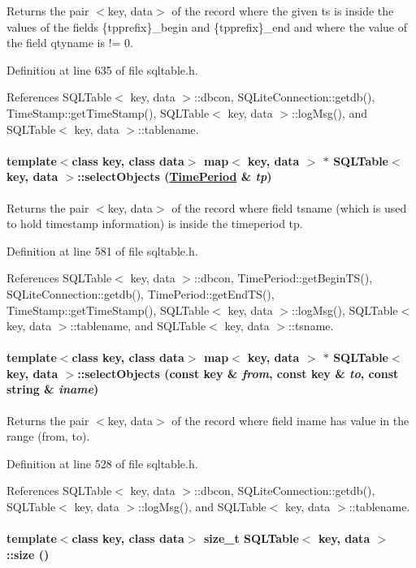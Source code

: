 Returns the pair $<$key, data$>$ of the record where the given ts is inside the values of the fields \{tpprefix\}\_\-begin and \{tpprefix\}\_\-end and where the value of the field qtyname is != 0. 

Definition at line 635 of file sqltable.h.

References SQLTable$<$ key, data $>$::dbcon, SQLite\-Connection::getdb(), Time\-Stamp::get\-Time\-Stamp(), SQLTable$<$ key, data $>$::log\-Msg(), and SQLTable$<$ key, data $>$::tablename.\hypertarget{classSQLTable_SQLTablea10}{
\paragraph[selectObjects]{\setlength{\rightskip}{0pt plus 5cm}template$<$class key, class data$>$ map$<$ key, data $>$ $\ast$ SQLTable$<$ key, data $>$::select\-Objects (\hyperlink{classTimePeriod}{Time\-Period} \& {\em tp})}\hfill}
\label{classSQLTable_SQLTablea10}


Returns the pair $<$key, data$>$ of the record where field tsname (which is used to hold timestamp information) is inside the timeperiod tp. 

Definition at line 581 of file sqltable.h.

References SQLTable$<$ key, data $>$::dbcon, Time\-Period::get\-Begin\-TS(), SQLite\-Connection::getdb(), Time\-Period::get\-End\-TS(), Time\-Stamp::get\-Time\-Stamp(), SQLTable$<$ key, data $>$::log\-Msg(), SQLTable$<$ key, data $>$::tablename, and SQLTable$<$ key, data $>$::tsname.\hypertarget{classSQLTable_SQLTablea9}{
\paragraph[selectObjects]{\setlength{\rightskip}{0pt plus 5cm}template$<$class key, class data$>$ map$<$ key, data $>$ $\ast$ SQLTable$<$ key, data $>$::select\-Objects (const key \& {\em from}, const key \& {\em to}, const string \& {\em iname})}\hfill}
\label{classSQLTable_SQLTablea9}


Returns the pair $<$key, data$>$ of the record where field iname has value in the range (from, to). 

Definition at line 528 of file sqltable.h.

References SQLTable$<$ key, data $>$::dbcon, SQLite\-Connection::getdb(), SQLTable$<$ key, data $>$::log\-Msg(), and SQLTable$<$ key, data $>$::tablename.\hypertarget{classSQLTable_SQLTablea29}{
\paragraph[size]{\setlength{\rightskip}{0pt plus 5cm}template$<$class key, class data$>$ size\_\-t SQLTable$<$ key, data $>$::size ()}\hfill}
\label{classSQLTable_SQLTablea29}


